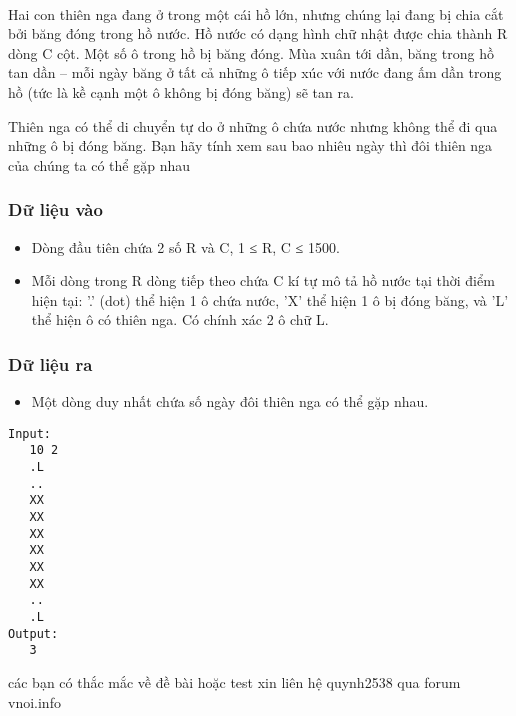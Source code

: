

 

Hai con thiên nga đang ở trong một cái hồ lớn, nhưng chúng lại đang bị chia cắt bởi băng đóng trong hồ nước. Hồ nước có dạng hình chữ nhật được chia thành R dòng C cột. Một số ô trong hồ bị băng đóng. Mùa xuân tới dần, băng trong hồ tan dần – mỗi ngày băng ở tất cả những ô tiếp xúc với nước đang ấm dần trong hồ (tức là kề cạnh một ô không bị đóng băng) sẽ tan ra.

Thiên nga có thể di chuyển tự do ở những ô chứa nước nhưng không thể đi qua những ô bị đóng băng. Bạn hãy tính xem sau bao nhiêu ngày thì đôi thiên nga của chúng ta có thể gặp nhau

\subsubsection{Dữ liệu vào}
\begin{itemize}
	\item Dòng đầu tiên chứa 2 số R và C, 1 ≤ R, C ≤ 1500.
	\item Mỗi dòng trong R dòng tiếp theo chứa C kí tự mô tả hồ nước tại thời điểm hiện tại: '.' (dot) thể hiện 1 ô chứa nước, 'X' thể hiện 1 ô bị đóng băng, và 'L' thể hiện ô có thiên nga. Có chính xác 2 ô chữ L.
\end{itemize}

\subsubsection{Dữ liệu ra}
\begin{itemize}
	\item Một dòng duy nhất chứa số ngày đôi thiên nga có thể gặp nhau.
\end{itemize}
\begin{verbatim}
Input:
   10 2
   .L
   ..
   XX
   XX
   XX
   XX
   XX
   XX
   ..
   .L
Output:
   3
\end{verbatim}

các bạn có thắc mắc về đề bài hoặc test xin liên hệ quynh2538 qua forum vnoi.info